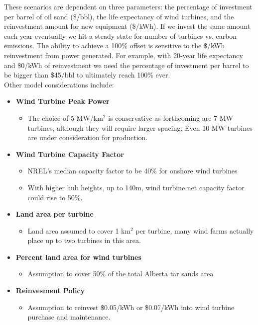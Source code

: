 \documentclass[11pt]{article}
\begin{document}
These scenarios are dependent on three parameters: the percentage of investment per barrel of oil sand (\$/bbl), the life expectancy of wind turbines, and the reinvestment amount for new equipment (\$/kWh). If we invest the same amount each year eventually we hit a steady state for number of turbines vs. carbon emissions. The ability to achieve a 100\% offset is sensitive to the \$/kWh reinvestment from power generated. For example, with 20-year life expectancy and \$0/kWh of reinvestment we need the percentage of investment per barrel to be bigger than \$45/bbl to ultimately reach 100\% ever.  \\

Other model considerations include:

\begin{itemize}
\item {\bf Wind Turbine Peak Power}
\begin{itemize}
\item The choice of 5 MW/km$^2$ is conservative as forthcoming are 7 MW turbines, although they will require larger spacing.  Even 10 MW turbines are under consideration for production.
\end{itemize}
\item {\bf Wind Turbine Capacity Factor}
\begin{itemize}
\item NREL's median capacity factor to be 40\% for onshore wind turbines
\item With higher hub heights, up to 140m, wind turbine net capacity factor could rise to 50\%.
\end{itemize}
\item {\bf Land area per turbine}
\begin{itemize}
\item Land area assumed to cover 1 km$^2$ per turbine, many wind farms actually place up to two turbines in this area.
\end{itemize}
\item {\bf Percent land area for wind turbines}
\begin{itemize}
\item Assumption to cover 50\% of the total Alberta tar sands area
\end{itemize}
\item {\bf Reinvesment Policy}
\begin{itemize}
\item Assumption to reinvest \$0.05/kWh or \$0.07/kWh into wind turbine purchase and maintenance.
\end{itemize}
\end{itemize}
\end{document}
